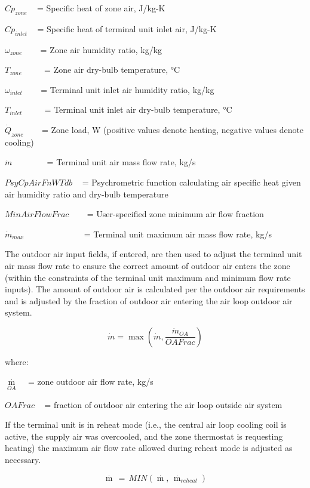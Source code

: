 \(C{p_{zone}}\) ~ = Specific heat of zone air, J/kg-K

\(C{p_{inlet}}\) ~ = Specific heat of terminal unit inlet air, J/kg-K

\({\omega_{zone}}\) ~~~ = Zone air humidity ratio, kg/kg

\({T_{zone}}\) ~~~~ = Zone air dry-bulb temperature, °C

\({\omega_{inlet}}\) ~~~ = Terminal unit inlet air humidity ratio, kg/kg

\({T_{inlet}}\) ~~~~ = Terminal unit inlet air dry-bulb temperature, °C

\({\dot Q_{zone}}\) ~~~ = Zone load, W (positive values denote heating, negative values denote cooling)

\(\dot m\) ~~~~~~~ = Terminal unit air mass flow rate, kg/s

\(PsyCpAirFnWTdb\) ~ = Psychrometric function calculating air specific heat given air humidity ratio and dry-bulb temperature

\(MinAirFlowFrac\) ~~~ = User-specified zone minimum air flow fraction

\({\dot m_{max}}\) ~~~~~~~~~~~~~ = Terminal unit maximum air mass flow rate, kg/s

The outdoor air input fields, if entered, are then used to adjust the terminal unit air mass flow rate to ensure the correct amount of outdoor air enters the zone (within the constraints of the terminal unit maximum and minimum flow rate inputs). The amount of outdoor air is calculated per the outdoor air requirements and is adjusted by the fraction of outdoor air entering the air loop outdoor air system.

\begin{equation}
\dot m = \max \left( \dot m, \frac{\dot m_{OA}}{OAFrac} \right)
\end{equation}

where:

\({\mathop m\limits^\cdot_{OA}}\) ~ = zone outdoor air flow rate, kg/s

\(OAFrac\) ~ = fraction of outdoor air entering the air loop outside air system

If the terminal unit is in reheat mode (i.e., the central air loop cooling coil is active, the supply air was overcooled, and the zone thermostat is requesting heating) the maximum air flow rate allowed during reheat mode is adjusted as necessary.

\begin{equation}
\mathop m\limits^\cdot  \, = \,MIN\left( {\mathop m\limits^\cdot  ,\,{{\mathop m\limits^\cdot  }_{reheat}}} \right)
\end{equation}

